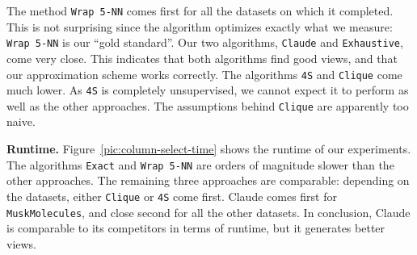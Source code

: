 The method \texttt{Wrap 5-NN} comes first for all the datasets on which it
completed. This is not surprising since the algorithm optimizes exactly what we
measure: \texttt{Wrap 5-NN} is our ``gold standard''. Our two algorithms,
\texttt{Claude} and \texttt{Exhaustive}, come very close. This indicates that
both algorithms find good views, and that our approximation scheme works
correctly.  The algorithms \texttt{4S} and \texttt{Clique} come much lower. As
\texttt{4S} is completely unsupervised, we cannot expect it to perform as well
as the other approaches. The assumptions behind \texttt{Clique} are
apparently too naive.

\textbf{Runtime.} Figure~\ref{pic:column-select-time} shows the runtime of our
experiments. The algorithms \texttt{Exact} and \texttt{Wrap 5-NN} are orders of
magnitude slower than the other approaches. The remaining three approaches are
comparable: depending on the datasets, either \texttt{Clique} or \texttt{4S}
come first. Claude comes first for \texttt{MuskMolecules}, and close
second for all the other datasets. In conclusion, Claude is comparable to
its competitors in terms of runtime, but it generates better views.

